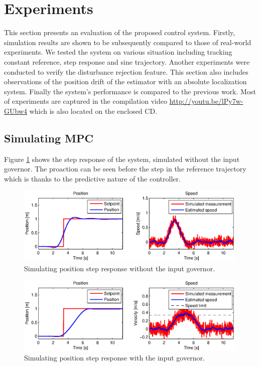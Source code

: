 \section{Experiments}

This section presents an evaluation of the proposed control system. Firstly, simulation results are shown to be subsequently compared to those of real-world experiments. We tested the system on various situation including tracking constant reference, step response and sine trajectory. Another experiments were conducted to verify the disturbance rejection feature. This section also includes observations of the position drift of the estimator with an absolute localization system. Finally the system's performance is compared to the previous work. Most of experiments are captured in the compilation video \url{http://youtu.be/lPy7w-GUbw4} which is also located on the enclosed CD. 

\subsection{Simulating MPC}

Figure \ref{fig:simulation_step_no_governor} shows the step response of the system, simulated without the input governor. The proaction can be seen before the step in the reference trajectory which is thanks to the predictive nature of the controller. 

\begin{figure}[H]
\centering
\includegraphics[width=0.99\textwidth]{fig/simulation1_step_no_governor.eps}
\caption{Simulating position step response without the input governor.}
\label{fig:simulation_step_no_governor}
\end{figure}

\begin{figure}[H]
\centering
\includegraphics[width=0.99\textwidth]{fig/simulation2_step_governor.eps}
\caption{Simulating position step response with the input governor.}
\label{fig:simulation_step_governor}
\end{figure}

